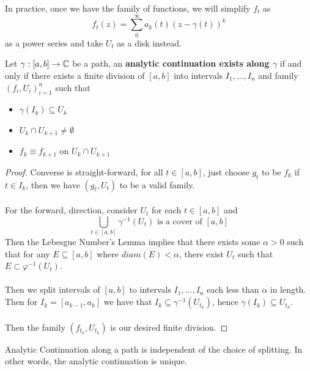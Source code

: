\begin{remark}
    In practice, once we have the family of functions, we will simplify $f_t$ as
    \[f_t(z) = \sum_0^\infty a_k(t) (z - \gamma(t))^k\]
    as a power series and take $U_t$ as a disk instead.
\end{remark}

\begin{proposition}
    Let $\gamma: [a, b] \to \mathbb{C}$ be a path, an \textbf{analytic continuation exists along $\gamma$} if and only if there exists a finite division of $[a, b]$ into intervals $I_1, ..., I_n$ and family $(f_i, U_i)_{i = 1}^n$ such that
    \begin{itemize}
        \item $\gamma(I_k) \subseteq U_k$
        \item $U_k \cap U_{k+1} \neq \emptyset$
        \item $f_k \equiv f_{k+1}$ on $U_k \cap U_{k+1}$
    \end{itemize}
\end{proposition}

\begin{proof}
    Converse is straight-forward, for all $t \in [a, b]$, just choose $g_t$ to be $f_k$ if $t \in I_k$, then we have $(g_t, U_t)$ to be a valid family.\\\\
    For the forward, direction, consider $U_t$ for each $t \in [a, b]$ and
    \[\bigcup_{t \in [a, b]} \gamma^{-1}(U_t) \text{ is a cover of } [a, b]\]
    Then the Lebesgue Number's Lemma implies that there exists some $\alpha > 0$ such that for any $E \subseteq [a, b]$ where $diam(E) < \alpha$, there exist $U_t$ such that $E \subset \varphi^{-1}(U_t)$.\\\\
    Then we split intervals of $[a, b]$ to intervals $I_1, ..., I_n$ each less than $\alpha$ in length. Then for $I_k = [a_{k-1}, a_k]$ we have that $I_k \subseteq \gamma^{-1}(U_{t_k})$, hence $\gamma(I_k) \subseteq U_{t_k}$.\\\\
    Then the family $(f_{t_k}, U_{t_k})$ is our desired finite division.
\end{proof}

\begin{proposition}
    Analytic Continuation along a path is independent of the choice of splitting. In other words, the analytic continuation is unique.
\end{proposition}

